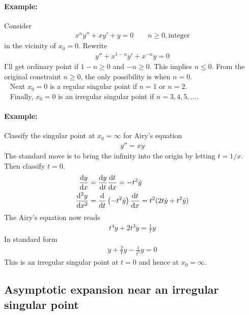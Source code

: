 \paragraph{Example:} Consider
\begin{gather*}
	x^n y'' + xy' + y = 0 \qquad n \geq 0, \text{integer}
\end{gather*}
in the vicinity of $x_0=0$. Rewrite
\begin{gather*}
	y'' + x^{1-n}y' + x^{-n}y = 0
\end{gather*}
I'll get ordinary point if $1-n \geq 0$ and $-n \geq 0$. This implies $n \leq 0$. From the original constraint $n \geq 0$, the only possibility is when $n=0$. \\
\ \newline
Next $x_0 = 0$ is a regular singular point if $n=1$ or $n=2$. \\
\ \newline
Finally, $x_0=0$ is an irregular singular point if $n=3,4,5, \dots$. 

\paragraph{Example:} Classify the singular point at $x_0 = \infty$ for Airy's equation
\begin{gather*}
	y'' = xy
\end{gather*}
The standard move is to bring the infinity into the origin by letting $t = 1/x$. Then classify $t=0$. 
\begin{align*}
	\frac{\mathrm{d} y}{\mathrm{d} x} &= \frac{\mathrm{d} y}{\mathrm{d} t} \frac{\mathrm{d} t}{\mathrm{d} x} = -t^2 \dot{y}  \\
	\frac{\mathrm{d}^2y}{\mathrm{d} x^2}&= \frac{\mathrm{d}}{\mathrm{d} t} \left(-t^2 \dot{y}\right) \frac{\mathrm{d} t}{\mathrm{d} x} = t^2 (2t \dot{y} +t^2 \ddot{y})
\end{align*}
The Airy's equation now reads
\begin{gather*}
	t^4 \ddot{y} + 2 t^3 \dot{y} = \frac{1}{t} y
\end{gather*}
In standard form
\begin{gather*}
	\ddot{y} + \frac{2}{t} \dot{y} - \frac{1}{t^5} y = 0
\end{gather*}
This is an irregular singular point at $t=0$ and hence at $x_0 = \infty$. 

\subsection*{Asymptotic expansion near an irregular singular point}

